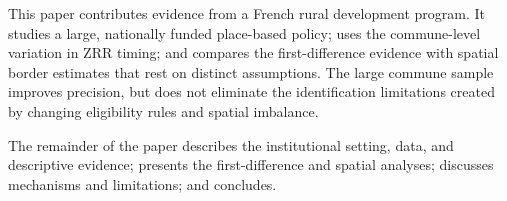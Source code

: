 This paper contributes evidence from a French rural development program. It studies a large, nationally funded place-based policy; uses the commune-level variation in ZRR timing; and compares the first-difference evidence with spatial border estimates that rest on distinct assumptions. The large commune sample improves precision, but does not eliminate the identification limitations created by changing eligibility rules and spatial imbalance.

The remainder of the paper describes the institutional setting, data, and descriptive evidence; presents the first-difference and spatial analyses; discusses mechanisms and limitations; and concludes.

